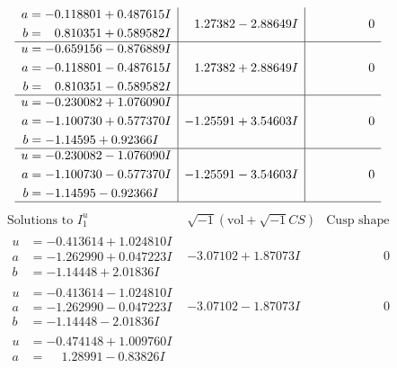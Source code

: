 \documentclass[1p]{elsarticle_modified}
\theoremstyle{definition}
\newcommand{\I}{\sqrt{-1}}
\begin{document}
$$\begin{array}{c|c|c}
\begin{aligned}
a &= -0.118801 + 0.487615 I \\
b &= \phantom{-}0.810351 + 0.589582 I\end{aligned}
 & \phantom{-}1.27382 - 2.88649 I & \phantom{-0.000000 } 0 \\ \hline\begin{aligned}
u &= -0.659156 - 0.876889 I \\
a &= -0.118801 - 0.487615 I \\
b &= \phantom{-}0.810351 - 0.589582 I\end{aligned}
 & \phantom{-}1.27382 + 2.88649 I & \phantom{-0.000000 } 0 \\ \hline\begin{aligned}
u &= -0.230082 + 1.076090 I \\
a &= -1.100730 + 0.577370 I \\
b &= -1.14595 + 0.92366 I\end{aligned}
 & -1.25591 + 3.54603 I & \phantom{-0.000000 } 0 \\ \hline\begin{aligned}
u &= -0.230082 - 1.076090 I \\
a &= -1.100730 - 0.577370 I \\
b &= -1.14595 - 0.92366 I\end{aligned}
 & -1.25591 - 3.54603 I & \phantom{-0.000000 } 0\\
 \hline 
 \end{array}$$\newpage$$\begin{array}{c|c|c}  
\text{Solutions to }I^u_{1}& \I (\text{vol} + \sqrt{-1}CS) & \text{Cusp shape}\\
 \hline 
\begin{aligned}
u &= -0.413614 + 1.024810 I \\
a &= -1.262990 + 0.047223 I \\
b &= -1.14448 + 2.01836 I\end{aligned}
 & -3.07102 + 1.87073 I & \phantom{-0.000000 } 0 \\ \hline\begin{aligned}
u &= -0.413614 - 1.024810 I \\
a &= -1.262990 - 0.047223 I \\
b &= -1.14448 - 2.01836 I\end{aligned}
 & -3.07102 - 1.87073 I & \phantom{-0.000000 } 0 \\ \hline\begin{aligned}
u &= -0.474148 + 1.009760 I \\
a &= \phantom{-}1.28991 - 0.83826 I \\

\end{aligned}
\end{array}$$
\end{document}

